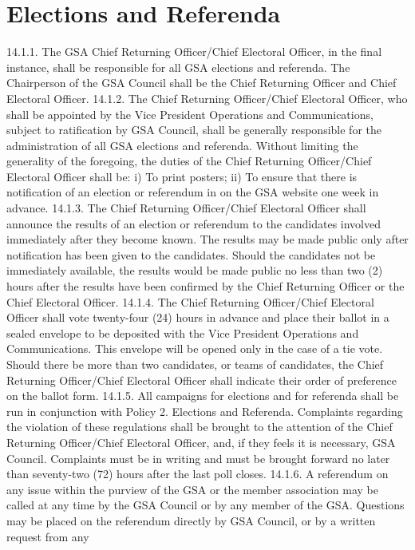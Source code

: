 \section{Elections and Referenda }
14.1.1. The GSA Chief Returning Officer/Chief Electoral Officer, in the 
final instance, shall be responsible for all GSA elections and referenda. 
The Chairperson of the GSA Council shall be the Chief Returning 
Officer and Chief Electoral Officer. 
14.1.2. The Chief Returning Officer/Chief Electoral Officer, who shall be 
appointed by the Vice President Operations and Communications, 
subject to ratification by GSA Council, shall be generally responsible 
for the administration of all GSA elections and referenda. Without 
limiting the generality of the foregoing, the duties of the Chief 
Returning Officer/Chief Electoral Officer shall be: 
i) To print posters; 
ii) To ensure that there is notification of an election or referendum in on 
the GSA website one week in advance. 
14.1.3. The Chief Returning Officer/Chief Electoral Officer shall announce 
the results of an election or referendum to the candidates involved 
immediately after they become known. The results may be made public only after notification has been given to the candidates. Should 
the candidates not be immediately available, the results would be made 
public no less than two (2) hours after the results have been confirmed 
by the Chief Returning Officer or the Chief Electoral Officer. 
14.1.4. The Chief Returning Officer/Chief Electoral Officer shall vote 
twenty-four (24) hours in advance and place their ballot in a sealed 
envelope to be deposited with the Vice President Operations and 
Communications. This envelope will be opened only in the case of a 
tie vote. Should there be more than two candidates, or teams of 
candidates, the Chief Returning Officer/Chief Electoral Officer shall 
indicate their order of preference on the ballot form. 
14.1.5. All campaigns for elections and for referenda shall be run in 
conjunction with Policy 2. Elections and Referenda. Complaints 
regarding the violation of these regulations shall be brought to the 
attention of the Chief Returning Officer/Chief Electoral Officer, and, if 
they feels it is necessary, GSA Council. Complaints must be in writing 
and must be brought forward no later than seventy-two (72) hours after 
the last poll closes. 
14.1.6. A referendum on any issue within the purview of the GSA or the 
member association may be called at any time by the GSA Council or 
by any member of the GSA. Questions may be placed on the 
referendum directly by GSA Council, or by a written request from any 
